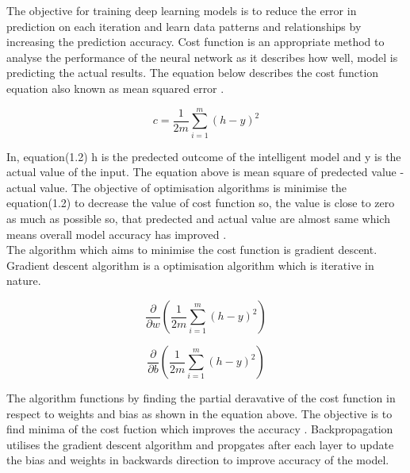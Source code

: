 The objective for training deep learning models is to reduce
the error in prediction on each iteration and 
learn data patterns and relationships by increasing the 
prediction accuracy. Cost function is an appropriate method to 
analyse the performance of the neural network as it describes 
how well, model is predicting the actual results. The equation below 
describes the cost function equation also known as mean squared error \citep*{7013173}.
\vspace{2mm}

\begin{center}
\begin{equation}
    c = \frac{1}{2m} \sum_{i=1}^m(h - y)^2
\end{equation}
\end{center}

In, equation(1.2)  h is the predected outcome of the intelligent model 
and y is the actual value of the input. The equation above is mean square of 
predected value - actual value. The objective of optimisation algorithms is 
minimise the equation(1.2) to decrease the value of cost function so, the value is 
close to zero as much as possible so, that predected and actual 
value are almost same which means overall model accuracy has improved \citep*{7013173}. \\

The algorithm which aims to minimise the cost function is gradient descent. Gradient descent algorithm 
is a optimisation algorithm which is iterative in nature. 

\begin{center}
    \begin{equation}
            \frac{\partial }{\partial w} (\frac{1}{2m} \sum_{i=1}^m(h - y)^2)
    \end{equation}

    \begin{equation}
        \frac{\partial }{\partial b} (\frac{1}{2m} \sum_{i=1}^m(h - y)^2) 
    \end{equation}
\end{center}


The algorithm functions by finding the 
partial deravative of the cost function in respect to weights and bias as shown in the equation above.
The objective is to find minima of the cost fuction which improves the accuracy \citep*{7013173}. 
Backpropagation utilises the gradient descent algorithm and propgates after each layer to 
update the bias and weights in backwards direction to improve accuracy of the model. 